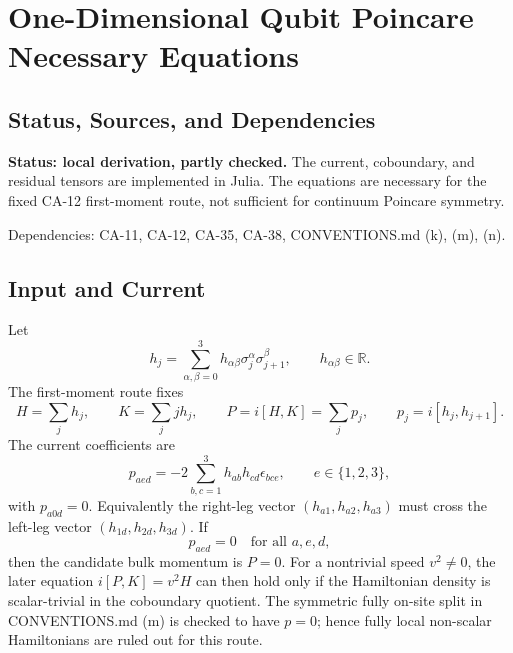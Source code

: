 
\section{One-Dimensional Qubit Poincare Necessary Equations}
\label{sec:qubit-1d-poincare-necessary-equations}

\subsection{Status, Sources, and Dependencies}

\textbf{Status: local derivation, partly checked.}  The current, coboundary,
and residual tensors are implemented in Julia.  The equations are necessary for
the fixed CA-12 first-moment route, not sufficient for continuum Poincare
symmetry.

Dependencies: CA-11, CA-12, CA-35, CA-38, CONVENTIONS.md (k), (m), (n).


\subsection{Input and Current}

Let
\[
  h_j=\sum_{\alpha,\beta=0}^3
  h_{\alpha\beta}\sigma_j^\alpha\sigma_{j+1}^\beta,
  \qquad h_{\alpha\beta}\in\mathbb R .
\]
The first-moment route fixes
\[
  H=\sum_j h_j,\qquad K=\sum_j jh_j,\qquad
  P=i[H,K]=\sum_jp_j,
  \qquad p_j=i[h_j,h_{j+1}].
\]
The current coefficients are
\[
  p_{aed}
  =
  -2\sum_{b,c=1}^3h_{ab}h_{cd}\epsilon_{bce},
  \qquad e\in\{1,2,3\},
  \tag{39.1}
\]
with \(p_{a0d}=0\).  Equivalently the right-leg vector
\((h_{a1},h_{a2},h_{a3})\) must cross the left-leg vector
\((h_{1d},h_{2d},h_{3d})\).  If
\[
  p_{aed}=0\quad\text{for all }a,e,d,
  \tag{39.2}
\]
then the candidate bulk momentum is \(P=0\).  For a nontrivial speed
\(v^2\neq0\), the later equation \(i[P,K]=v^2H\) can then hold only if the
Hamiltonian density is scalar-trivial in the coboundary quotient.  The
symmetric fully on-site split in CONVENTIONS.md (m) is checked to have
\(p=0\); hence fully local non-scalar Hamiltonians are ruled out for this
route.

